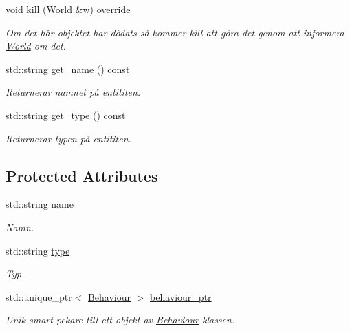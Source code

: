 \begin{DoxyCompactItemize}
\item 
void \hyperlink{classProjectile_a10d7ca9bb3d022246196572d008f1d59}{kill} (\hyperlink{classWorld}{World} \&w) override
\begin{DoxyCompactList}\small\item\em Om det här objektet har dödats så kommer kill att göra det genom att informera \hyperlink{classWorld}{World} om det. \end{DoxyCompactList}\item 
std\+::string \hyperlink{classEntity_a75c7e4aad3df2e053ee5b43169509534}{get\+\_\+name} () const 
\begin{DoxyCompactList}\small\item\em Returnerar namnet på entititen. \end{DoxyCompactList}\item 
std\+::string \hyperlink{classEntity_a0e9ef479c1147e21e5bcb338cb858df2}{get\+\_\+type} () const 
\begin{DoxyCompactList}\small\item\em Returnerar typen på entititen. \end{DoxyCompactList}\end{DoxyCompactItemize}
\subsection*{Protected Attributes}
\begin{DoxyCompactItemize}
\item 
std\+::string \hyperlink{classEntity_a931b21fbdebb1a5963b4bcab5df128f5}{name}
\begin{DoxyCompactList}\small\item\em Namn. \end{DoxyCompactList}\item 
std\+::string \hyperlink{classEntity_a298a9ebf2474bb00874b5ff6a0d637ef}{type}
\begin{DoxyCompactList}\small\item\em Typ. \end{DoxyCompactList}\item 
std\+::unique\+\_\+ptr$<$ \hyperlink{classBehaviour}{Behaviour} $>$ \hyperlink{classEntity_adb6e36848db24e6d48e6d295e19d3972}{behaviour\+\_\+ptr}
\begin{DoxyCompactList}\small\item\em Unik smart-\/pekare till ett objekt av \hyperlink{classBehaviour}{Behaviour} klassen. \end{DoxyCompactList}\end{DoxyCompactItemize}


